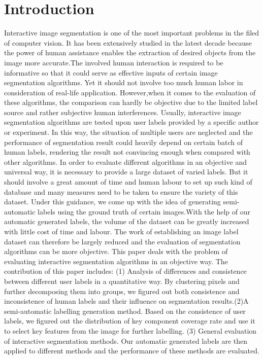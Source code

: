 \documentclass[runningheads,a4paper]{llncs}
\begin{document}
\section{Introduction}

Interactive image segmentation is one of the most important problems in the filed of computer vision. It has been extensively studied in the latest decade because the power of human assistance enables the extraction of desired objects from the image more accurate.The involved human interaction is required to be informative so that it could serve as effective inputs of certain image segmentation algorithms. Yet it should not involve too much human labor in consideration of real-life application. However,when it comes to the evaluation of these algorithms, the comparison can hardly be objective due to the limited label source and rather subjective human interferences. Usually, interactive image segmentation algorithms are tested upon user labels provided by a specific author or experiment. In this way, the situation of multiple users are neglected and the performance of segmentation result could heavily depend on certain batch of human labels, rendering the result not convincing enough when compared with other algorithms. In order to evaluate different algorithms in an objective and universal way, it is necessary to provide a large dataset of varied labels. But it should involve a great amount of time and human labour to set up such kind of database and many measures need to be taken to ensure the variety of this dataset. Under this guidance, we come up with the idea of generating semi-automatic labels using the ground truth of certain images.With the help of our automatic generated labels, the volume of the dataset can be greatly increased with little cost of time and labour. The work of establishing an image label dataset can therefore be largely reduced and the evaluation of segmentation algorithms can  be more objective.
This paper deals with the problem of evaluating interactive segmentation algorithms in an objective way. The contribution of this paper includes: (1)  Analysis of differences and consistence between different user labels in a quantitative way. By clustering pixels and further decomposing them into groups, we figured out both consistence and inconsistence of human labels and their influence on segmentation results.(2)A semi-automatic labelling generation method. Based on the consistence of user labels, we figured out the distribution of key component coverage rate and use it to select key features from the image for further labelling. (3) General evaluation of interactive segmentation methods. Our automatic generated labels are then applied to different methods and the performance of these methods are evaluated.
\end{document}
